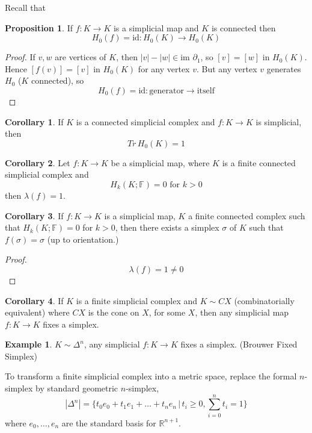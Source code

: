 \documentclass[a4paper,14pt]{extarticle}
\theoremstyle{definition}
\newtheorem*{corollary}{Corollary}
\newtheorem*{proposition}{Proposition}
\newtheorem*{eg}{Example}
\begin{document}
Recall that 
\begin{proposition}
	If $f:K\rightarrow K$ is a simplicial map and $K$ is connected then 
	\[H_0(f)=\text{id}:H_0(K)\rightarrow H_0(K)\]
\end{proposition}

\begin{proof}
	If $v,w$ are vertices of $K$, then $|v|-|w|\in\text{im } \partial_1$, so 
	$[v]=[w]$ in $H_0(K)$. Hence $[f(v)]=[v]$ in $H_0(K)$ for any vertex $v$. But any 
	vertex $v$ generates $H_0$ ($K$ connected), so 
	\[H_0(f)=\text{id}:\text{generator}\rightarrow\text{itself}\]
\end{proof}

\begin{corollary}
	If $K$ is a connected simplicial complex and $f:K\rightarrow K$ is simplicial, then 
	\[Tr \,H_0(K)=1\]
\end{corollary}

\begin{corollary}
	Let $f:K\rightarrow K$ be a simplicial map, where $K$ is a finite connected simplicial 
	complex and \[H_k(K;\mathbb{F})=0\text{ for }k>0\] then $\lambda(f)=1$.
\end{corollary}

\begin{corollary}
	If $f:K\rightarrow K$ is a simplicial map, $K$ a finite connected complex such that 
	$H_k(K;\mathbb{F})=0$ for $k>0$, then there exists a simplex $\sigma$ of $K$ such that 
	$f(\sigma)=\sigma$ (up to orientation.)
\end{corollary}

\begin{proof}
	\[\lambda(f)=1\neq0\]
\end{proof}

\begin{corollary}
	If $K$ is a finite simplicial complex and $K\sim CX$ (combinatorially equivalent) where 
	$CX$ is the cone on $X$, for some $X$, then any simplicial map $f:K\rightarrow K$ fixes
	a simplex.
\end{corollary}

\begin{eg}
	$K\sim \Delta^n$, any simplicial $f:K\rightarrow K$ fixes a simplex. (Brouwer Fixed Simplex)
\end{eg}

To transform a finite simplicial complex into a metric space, replace the 
formal $n$-simplex by standard geometric $n$-simplex, 
\[|\Delta^n|=\{t_0 e_0 + t_1 e_1 + \ldots + t_n e_n\,|\,t_i\geq 0, \sum_{i=0}^n t_i = 1\}\]
where $e_0, \ldots, e_n$ are the standard basis for $\mathbb{R}^{n+1}$. \\
\end{document}
